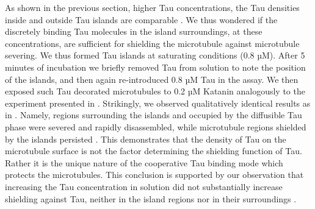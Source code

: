 As shown in the previous section, higher Tau concentrations, the Tau densities inside and outside Tau islands are comparable . We thus wondered if the discretely binding Tau molecules in the island surroundings, at these concentrations, are sufficient for shielding the microtubule against microtubule severing. We thus formed Tau islands at saturating conditions (0.8 µM). After 5 minutes of incubation we briefly removed Tau from solution to note the position of the islands, and then again re-introduced 0.8 µM Tau in the assay. We then exposed such Tau decorated microtubules to 0.2 µM Katanin analogously to the experiment presented in . Strikingly, we observed qualitatively identical results as in . Namely, regions surrounding the islands and occupied by the diffusible Tau phase were severed and rapidly disassembled, while microtubule regions shielded by the islands persisted . This demonstrates that the density of Tau on the microtubule surface is not the factor determining the shielding function of Tau. Rather it is the unique nature of the cooperative Tau binding mode which protects the microtubules. This conclusion is supported by our observation that increasing the Tau concentration in solution did not substantially increase shielding against Tau, neither in the island regions  nor in their surroundings .\par

